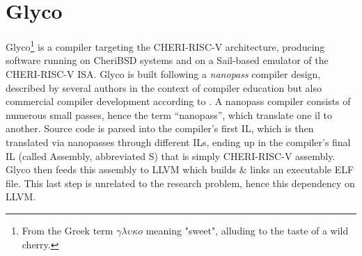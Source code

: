 \documentclass[main.tex]{subfiles}
\begin{document}
\onlyinsubfile{\mainmatter{}}

\chapter{Glyco}
Glyco\footnote{From the Greek term $\gamma\lambda\upsilon\kappa{}o$ meaning "sweet", alluding to the taste of a wild cherry.} is a compiler targeting the CHERI-RISC-V architecture, producing software running on CheriBSD systems and on a Sail-based emulator of the CHERI-RISC-V ISA. Glyco is built following a \emph{nanopass} compiler design, described by several authors in the context of compiler education but also commercial compiler development according to \cite{:commcomp}. A \gls{nanopass} compiler consists of numerous small passes, hence the term \enquote{nanopass}, which translate one \gls{il} to another. Source code is parsed into the compiler’s first IL, which is then translated via nanopasses through different ILs, ending up in the compiler's final IL (called Assembly, abbreviated S) that is simply CHERI-RISC-V assembly. Glyco then feeds this assembly to LLVM which builds \& links an executable ELF file. This last step is unrelated to the research problem, hence this dependency on LLVM.

\biblio{}
\onlyinsubfile{\glsaddall\printglossaries}
\end{document}

